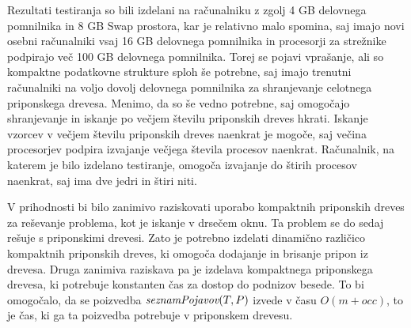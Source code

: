 Rezultati testiranja so bili izdelani na računalniku z zgolj 4 GB delovnega pomnilnika in 8 GB Swap prostora, kar je relativno malo spomina, saj imajo novi osebni računalniki vsaj 16 GB delovnega pomnilnika in procesorji za strežnike podpirajo več 100 GB delovnega pomnilnika. Torej se pojavi vprašanje, ali so kompaktne podatkovne strukture sploh še potrebne, saj imajo trenutni računalniki na voljo dovolj delovnega pomnilnika za shranjevanje celotnega priponskega drevesa. Menimo, da so še vedno potrebne, saj omogočajo shranjevanje in iskanje po večjem številu priponskih dreves hkrati. Iskanje vzorcev v večjem številu priponskih dreves naenkrat je mogoče, saj večina procesorjev podpira izvajanje večjega števila procesov naenkrat. Računalnik, na katerem je bilo izdelano testiranje, omogoča izvajanje do štirih procesov naenkrat, saj ima dve jedri in štiri niti.


V prihodnosti bi bilo zanimivo raziskovati uporabo kompaktnih priponskih dreves za reševanje problema, kot je iskanje v drsečem oknu. Ta problem se do sedaj rešuje s priponskimi drevesi. Zato je potrebno izdelati dinamično različico kompaktnih priponskih dreves, ki omogoča dodajanje in brisanje pripon iz drevesa. Druga zanimiva raziskava pa je izdelava kompaktnega priponskega drevesa, ki potrebuje konstanten čas za dostop do podnizov besede. To bi omogočalo, da se poizvedba $ \mathop{\textit{seznamPojavov}}(T,P) $ izvede v času $O(m+occ)$, to je čas, ki ga ta poizvedba potrebuje v priponskem drevesu.
